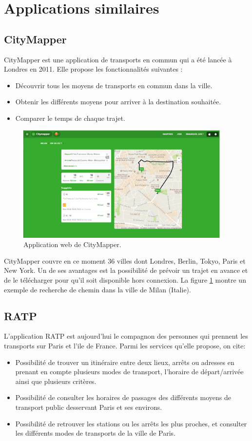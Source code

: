 \section{Applications similaires}			
\subsection{CityMapper}
CityMapper est une application de transports en commun qui a été lancée à Londres en 2011.
Elle propose les fonctionnalités suivantes : 
\begin{itemize}
	\item Découvrir tous les moyens de transports en commun dans la ville.
	\item Obtenir les différents moyens pour arriver à la destination souhaitée.
	\item Comparer le temps de chaque trajet.
\end{itemize}

\begin{figure}[h!]
	\center
	\includegraphics[width=0.95\textwidth]{img/citymapper.png}
	\caption{Application web de CityMapper.}
	\label{fig:CityMapper}
\end{figure}

CityMapper couvre en ce moment 36 villes dont Londres, Berlin, Tokyo, Paris et New York.  Un de ses avantages est la possibilité de prévoir un trajet en avance et de le télécharger pour qu'il soit disponible hors connexion.
La figure \ref{fig:CityMapper} montre un exemple de recherche de chemin dans la ville de Milan (Italie).

\subsection{RATP}
L'application RATP est aujourd'hui le compagnon des personnes qui prennent les transports sur Paris et l'ile de France.
Parmi les services qu'elle propose, on cite:
\begin{itemize}
	\item Possibilité de trouver un itinéraire entre deux lieux, arrêts ou adresses en prenant en compte plusieurs modes de transport, l'horaire de départ/arrivée ainsi que plusieurs critères.
	\item Possibilité de consulter les horaires de passages des différents moyens de transport public desservant Paris et ses environs. 
	\item Possibilité de retrouver les stations ou les arrêts les plus proches, et consulter les différents modes de transports de la ville de Paris.
\end{itemize}

